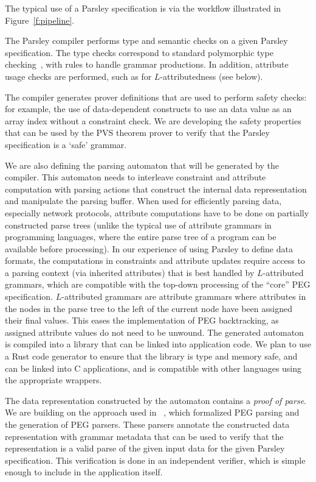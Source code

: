 \documentclass[letterpaper]{article}
\begin{document}
The typical use of a Parsley specification is via the workflow
illustrated in Figure~\ref{f:pipeline}.

The Parsley compiler performs type and semantic checks on a given
Parsley specification.  The type checks correspond to standard
polymorphic type checking~\cite{Dunfield13:bidir}\cite{zhao19:bidir},
with rules to handle grammar productions.  In addition, attribute
usage checks are performed, such as for $L$-attributedness (see
below).

The compiler generates prover definitions that are used to perform
safety checks: for example, the use of data-dependent constructs to
use an data value as an array index without a constraint check.  We
are developing the safety properties that can be used by the PVS
theorem prover to verify that the Parsley specification is a `safe'
grammar.

We are also defining the parsing automaton that will be generated by
the compiler.  This automaton needs to interleave constraint and
attribute computation with parsing actions that construct the internal
data representation and manipulate the parsing buffer.  When used for
efficiently parsing data, especially network protocols, attribute
computations have to be done on partially constructed parse trees
(unlike the typical use of attribute grammars in programming
languages, where the entire parse tree of a program can be available
before processing).  In our experience of using Parsley to define data
formats, the computations in constraints and attribute updates require
access to a parsing context (via inherited attributes) that is best
handled by $L$-attributed grammars, which are compatible with the
top-down processing of the ``core'' PEG specification.  $L$-attributed
grammars are attribute grammars where attributes in the nodes in the
parse tree to the left of the current node have been assigned their
final values.  This eases the implementation of PEG backtracking, as
assigned attribute values do not need to be unwound.  The generated
automaton is compiled into a library that can be linked into
application code.  We plan to use a Rust code generator to ensure that
the library is type and memory safe, and can be linked into C
applications, and is compatible with other languages using the
appropriate wrappers.

The data representation constructed by the automaton contains a {\em
  proof of parse}.  We are building on the approach used in
~\cite{Blaudeau_2020}, which formalized PEG parsing and the generation
of PEG parsers.  These parsers annotate the constructed data
representation with grammar metadata that can be used to verify that
the representation is a valid parse of the given input data for the
given Parsley specification.  This verification is done in an
independent verifier, which is simple enough to include in the
application itself.
\end{document}
